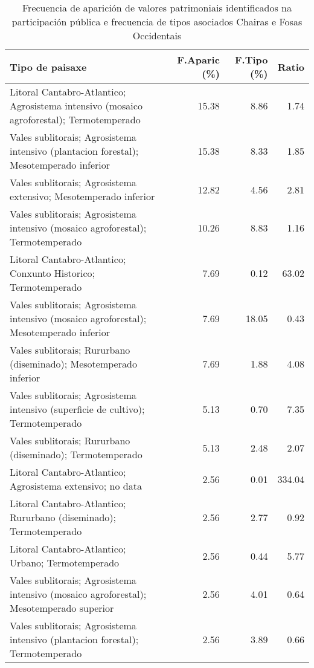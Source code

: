 \begin{table}[p]
\centering
\caption{Frecuencia de aparición de valores patrimoniais identificados na participación pública e frecuencia de tipos asociados Chairas e Fosas Occidentais} 
\label{vsixotpat11}
\begin{tabular}{lrrr}
  \hline
Tipo de paisaxe & F.Aparic (\%) & F.Tipo (\%) & Ratio \\ 
  \hline
Litoral Cantabro-Atlantico; Agrosistema intensivo (mosaico agroforestal); Termotemperado & 15.38 & 8.86 & 1.74 \\ 
  Vales sublitorais; Agrosistema intensivo (plantacion forestal); Mesotemperado inferior & 15.38 & 8.33 & 1.85 \\ 
  Vales sublitorais; Agrosistema extensivo; Mesotemperado inferior & 12.82 & 4.56 & 2.81 \\ 
  Vales sublitorais; Agrosistema intensivo (mosaico agroforestal); Termotemperado & 10.26 & 8.83 & 1.16 \\ 
  Litoral Cantabro-Atlantico; Conxunto Historico; Termotemperado & 7.69 & 0.12 & 63.02 \\ 
  Vales sublitorais; Agrosistema intensivo (mosaico agroforestal); Mesotemperado inferior & 7.69 & 18.05 & 0.43 \\ 
  Vales sublitorais; Rururbano (diseminado); Mesotemperado inferior & 7.69 & 1.88 & 4.08 \\ 
  Vales sublitorais; Agrosistema intensivo (superficie de cultivo); Termotemperado & 5.13 & 0.70 & 7.35 \\ 
  Vales sublitorais; Rururbano (diseminado); Termotemperado & 5.13 & 2.48 & 2.07 \\ 
  Litoral Cantabro-Atlantico; Agrosistema extensivo; no data & 2.56 & 0.01 & 334.04 \\ 
  Litoral Cantabro-Atlantico; Rururbano (diseminado); Termotemperado & 2.56 & 2.77 & 0.92 \\ 
  Litoral Cantabro-Atlantico; Urbano; Termotemperado & 2.56 & 0.44 & 5.77 \\ 
  Vales sublitorais; Agrosistema intensivo (mosaico agroforestal); Mesotemperado superior & 2.56 & 4.01 & 0.64 \\ 
  Vales sublitorais; Agrosistema intensivo (plantacion forestal); Termotemperado & 2.56 & 3.89 & 0.66 \\ 
   \hline
\end{tabular}
\end{table}
